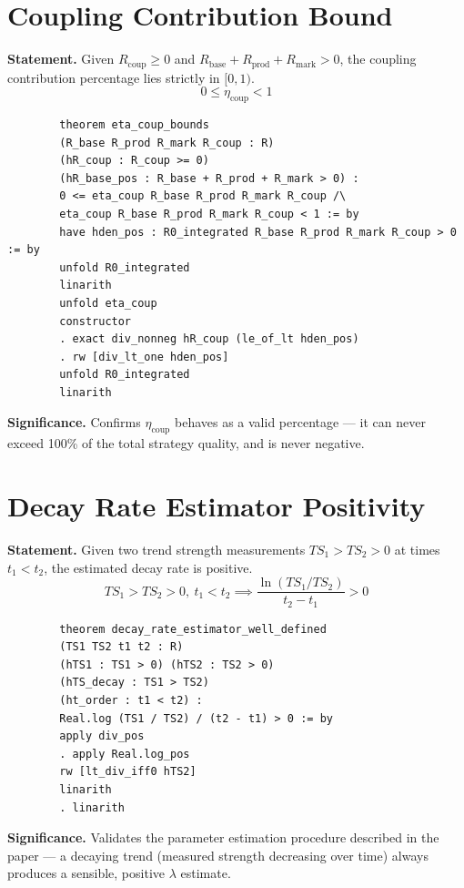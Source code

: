 \documentclass[11pt,a4paper]{article}
\begin{document}
	\section{Coupling Contribution Bound}
	
	\textbf{Statement.} Given $R_{\text{coup}} \geq 0$ and $R_{\text{base}} + R_{\text{prod}} + R_{\text{mark}} > 0$, the coupling contribution percentage lies strictly in $[0, 1)$.
	\begin{equation}
		0 \leq \eta_{\text{coup}} < 1
	\end{equation}
	
	\begin{lstlisting}
		theorem eta_coup_bounds
		(R_base R_prod R_mark R_coup : R)
		(hR_coup : R_coup >= 0)
		(hR_base_pos : R_base + R_prod + R_mark > 0) :
		0 <= eta_coup R_base R_prod R_mark R_coup /\
		eta_coup R_base R_prod R_mark R_coup < 1 := by
		have hden_pos : R0_integrated R_base R_prod R_mark R_coup > 0 := by
		unfold R0_integrated
		linarith
		unfold eta_coup
		constructor
		. exact div_nonneg hR_coup (le_of_lt hden_pos)
		. rw [div_lt_one hden_pos]
		unfold R0_integrated
		linarith
	\end{lstlisting}
	
	\noindent\textbf{Significance.} Confirms $\eta_{\text{coup}}$ behaves as a valid percentage --- it can never exceed 100\% of the total strategy quality, and is never negative.
	
	\section{Decay Rate Estimator Positivity}
	
	\textbf{Statement.} Given two trend strength measurements $TS_1 > TS_2 > 0$ at times $t_1 < t_2$, the estimated decay rate is positive.
	\begin{equation}
		TS_1 > TS_2 > 0,\ t_1 < t_2 \implies \frac{\ln(TS_1/TS_2)}{t_2 - t_1} > 0
	\end{equation}
	
	\begin{lstlisting}
		theorem decay_rate_estimator_well_defined
		(TS1 TS2 t1 t2 : R)
		(hTS1 : TS1 > 0) (hTS2 : TS2 > 0)
		(hTS_decay : TS1 > TS2)
		(ht_order : t1 < t2) :
		Real.log (TS1 / TS2) / (t2 - t1) > 0 := by
		apply div_pos
		. apply Real.log_pos
		rw [lt_div_iff0 hTS2]
		linarith
		. linarith
	\end{lstlisting}
	
	\noindent\textbf{Significance.} Validates the parameter estimation procedure described in the paper --- a decaying trend (measured strength decreasing over time) always produces a sensible, positive $\lambda$ estimate.
	
\end{document}
